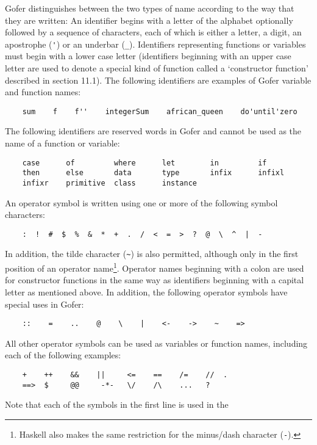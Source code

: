 Gofer distinguishes between the two types of name according to the  way
that they are written:
\BI
\IT  An  identifier  begins with a  letter  of the  alphabet optionally
     followed by a sequence of characters, each of which  is  either  a
     letter,  a  digit,  an  apostrophe  (\verb='=)  or   an   underbar
     (\verb=_=).
     Identifiers representing functions or variables must begin  with  a
     lower case letter (identifiers beginning with an upper case letter
     are  used  to  denote  a  special  kind  of  function   called   a
     `constructor function' described in section 11.1).  The  following
     identifiers are examples of Gofer variable and function names:
\begin{verbatim}
    sum    f    f''    integerSum    african_queen    do'until'zero
\end{verbatim}
     The following identifiers are reserved words in Gofer  and  cannot
     be used as the name of a function or variable:
\begin{verbatim}
    case      of         where      let        in         if
    then      else       data       type       infix      infixl
    infixr    primitive  class      instance
\end{verbatim}
\IT  An  operator symbol  is written using one or more of the following
     symbol characters:
\begin{verbatim}
    :  !  #  $  %  &  *  +  .  /  <  =  >  ?  @  \  ^  |  -
\end{verbatim}
     In addition, the tilde character (\verb=~=) is also  permitted,  although
     only in the first position of an  operator  name\footnote{Haskell
     also makes the  same  restriction  for  the  minus/dash  character
     (\verb=-=).}.   Operator  names  beginning  with  a  colon  are  used  for
     constructor functions in the same  way  as  identifiers  beginning
     with a capital  letter  as  mentioned  above.   In  addition,  the
     following operator symbols have special uses in Gofer:
\begin{verbatim}
    ::    =    ..    @    \    |    <-    ->    ~    =>
\end{verbatim}
     All other operator  symbols can be used as variables  or  function
     names, including each of the following examples:
\begin{verbatim}
    +    ++    &&    ||     <=    ==    /=    //  .
    ==>  $     @@     -*-   \/    /\    ...   ?
\end{verbatim}
     Note that each of the symbols in the first line is  used  in  the
